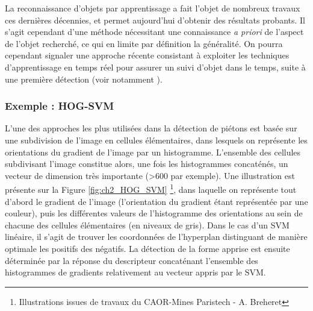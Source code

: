 La reconnaissance d'objets par apprentissage a fait l'objet de nombreux travaux ces dernières décennies, et permet aujourd'hui d'obtenir des résultats probants. Il s'agit cependant d'une méthode nécessitant une connaissance \textit{a priori} de l'aspect de l'objet recherché, ce qui en limite par définition la généralité. On pourra cependant signaler une approche récente consistant à exploiter les techniques d'apprentissage en temps réel pour assurer un suivi d'objet dans le temps, suite à une première détection (voir notamment \cite{Hamdoun2010, Kalal, Kalal2009}).

\subsubsection{Exemple : HOG-SVM}
L'une des approches les plus utilisées dans la détection de piétons est basée sur une subdivision de l'image en cellules élémentaires, dans lesquels on représente les orientations du gradient de l'image par un histogramme. L'ensemble des cellules subdivisant l'image constitue alors, une fois les histogrammes concaténés, un vecteur de dimension très importante (>600 par exemple). Une illustration est présente sur la Figure \ref{fig:ch2_HOG_SVM} \footnote{Illustrations issues de travaux du CAOR-Mines Paristech - A. Breheret}, dans laquelle on représente tout d'abord le gradient de l'image (l'orientation du gradient étant représentée par une couleur), puis les différentes valeurs de l'histogramme des orientations au sein de chacune des cellules élémentaires (en niveaux de gris). Dans le cas d'un SVM linéaire, il s'agit de trouver les coordonnées de l'hyperplan distinguant de manière optimale les positifs des négatifs. La détection de la forme apprise est ensuite déterminée par la réponse du descripteur concaténant l'ensemble des histogrammes de gradients relativement au vecteur appris par le SVM.

